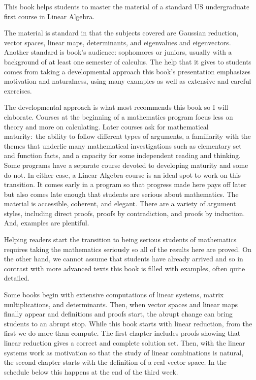 {\setlength{\parskip}{.7ex}  %
\bigskip
\vspace*{1.25in plus .2in minus .1in}
\vspace*{.4in plus .1in minus .05in}
\par\noindent
This book helps students to master the material of a standard 
US undergraduate first course in Linear Algebra.

The material is standard in that the subjects covered are
Gaussian reduction, 
vector spaces, linear maps,
determinants, and eigenvalues and eigenvectors.
Another standard is book's audience:
sophomores or juniors, usually with a background 
of at least one semester of calculus. 
The help that it gives to students comes from taking a developmental 
approach\Dash 
this book's presentation emphasizes motivation and naturalness, 
using many examples as well as extensive and careful exercises.

The developmental approach is what most recommends this book
so I will elaborate.
Courses at the beginning of a mathematics program
focus less on theory and more on calculating.
Later courses
ask for mathematical maturity:~the ability to follow different 
types of arguments, 
a familiarity with
the themes that underlie many mathematical investigations such as
elementary set and function facts,
and a capacity for some independent reading and thinking.
Some programs have a separate course devoted to developing maturity and
some do not. 
In either case, a Linear Algebra course 
is an ideal spot to work on this transition.
It comes early in a program so that progress made here pays off later
but also comes late enough that
students are serious about mathematics.
The material is accessible, coherent, and elegant.
There are a variety of argument styles, including 
direct proofs, proofs by
contradiction, and proofs by induction.
And, examples are plentiful.

Helping readers start the transition to being serious students of 
mathematics
requires taking the mathematics seriously so
all of the results here are proved.
On the other hand, we cannot
assume that students have already arrived
and so 
in contrast with more advanced texts 
this book is filled with examples,
often quite detailed.

Some books
begin with extensive computations of linear systems, 
matrix multiplications, 
and determinants.
Then, when 
vector spaces and linear maps finally appear
and definitions and proofs start, the abrupt change
can bring students to an abrupt stop.
While this book starts with
linear reduction, from the first
we do more than compute.
The first chapter
includes proofs showing that linear reduction gives a correct and
complete solution set.
Then, with the linear systems work as motivation
so that the study of linear combinations is natural,
the second chapter starts with the definition of a real vector space.
In the schedule below this happens at the end of the third week.

}
